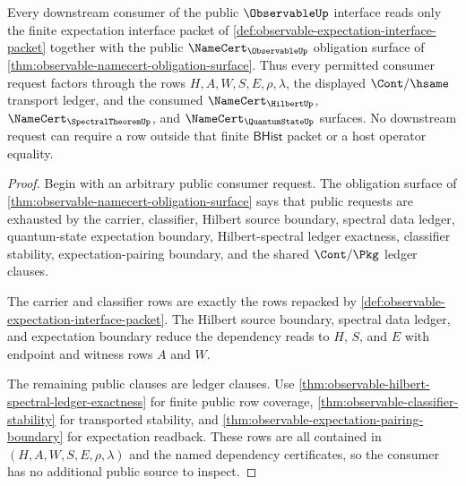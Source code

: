 \begin{theorem}
\label{thm:observable-public-consumer-exhaustion}
Every downstream consumer of the public $\ObservableUp$ interface reads only
the finite expectation interface packet of
\autoref{def:observable-expectation-interface-packet} together with the
public $\NameCert_{\ObservableUp}$ obligation surface of
\autoref{thm:observable-namecert-obligation-surface}. Thus every permitted
consumer request factors through the rows $H,A,W,S,E,\rho,\lambda$, the
displayed $\Cont/\hsame$ transport ledger, and the consumed
$\NameCert_{\HilbertUp}$, $\NameCert_{\SpectralTheoremUp}$, and
$\NameCert_{\QuantumStateUp}$ surfaces. No downstream request can require a
row outside that finite $\mathsf{BHist}$ packet or a host operator equality.
\end{theorem}
\begin{proof}
Begin with an arbitrary public consumer request. The obligation surface of
\autoref{thm:observable-namecert-obligation-surface} says that public
requests are exhausted by the carrier, classifier, Hilbert source boundary,
spectral data ledger, quantum-state expectation boundary,
Hilbert-spectral ledger exactness, classifier stability, expectation-pairing
boundary, and the shared $\Cont/\Pkg$ ledger clauses.

The carrier and classifier rows are exactly the rows repacked by
\autoref{def:observable-expectation-interface-packet}. The Hilbert source
boundary, spectral data ledger, and expectation boundary reduce the
dependency reads to $H$, $S$, and $E$ with endpoint and witness rows $A$ and
$W$.

The remaining public clauses are ledger clauses. Use
\autoref{thm:observable-hilbert-spectral-ledger-exactness} for finite public
row coverage, \autoref{thm:observable-classifier-stability} for transported
stability, and \autoref{thm:observable-expectation-pairing-boundary} for
expectation readback. These rows are all contained in
$(H,A,W,S,E,\rho,\lambda)$ and the named dependency certificates, so the
consumer has no additional public source to inspect.
\end{proof}

